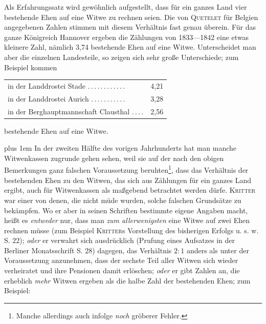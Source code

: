 Als Erfahrungssatz wird gewöhnlich aufgestellt, dass für ein ganzes Land vier bestehende Ehen auf eine Witwe zu rechnen seien. Die von \textsc{Quetelet} für Belgien angegebenen Zahlen stimmen mit diesem Verhältnis fast genau überein. Für das ganze Königreich Hannover ergeben die Zählungen von 1833—1842 eine etwas kleinere Zahl, nämlich 3,74 bestehende Ehen auf eine Witwe. Unterscheidet man aber die einzelnen Landesteile, so zeigen sich sehr große Unterschiede; zum Beispiel kommen
\begin{center}
\begin{tabular}{l@{\;}r}
in der Landdrostei Stade .\,.\,.\,.\,.\,.\,.\,.\,.\,.\,.\,. & 4,21\\
in der Landdrostei Aurich .\,.\,.\,.\,.\,.\,.\,.\,.\,.\,. & 3,28\\
in der Berghauptmannschaft Clausthal .\,.\,.\,. & 2,56
\end{tabular}
\end{center}
\noindent bestehende Ehen auf eine Witwe.

{\rightskip=0pt plus 1em
In der zweiten Hälfte des vorigen Jahrhunderts hat man manche Witwenkassen zugrunde gehen sehen, weil sie auf der nach den obigen Bemerkungen ganz falschen Voraussetzung beruhten\footnote{Manche allerdings auch infolge \textit{noch} gröberer Fehler.}, dass das Verhältnis der bestehenden Ehen zu den Witwen, das sich aus Zählungen für ein ganzes Land ergibt, auch für Witwenkassen als maßgebend betrachtet werden dürfe. \textsc{Kritter} war einer von denen, die nicht müde wurden, solche falschen Grundsätze zu bekämpfen. Wo er aber in seinen Schriften bestimmte eigene Angaben macht, heißt es \textit{entweder} nur, dass man \textit{zum allerwenigsten} eine Witwe auf zwei Ehen rechnen müsse (zum Beispiel \textsc{Kritter}s Vorstellung des bisherigen Erfolgs u. s. w. S. 22); \textit{oder} er verwahrt sich ausdrücklich (Prufung eines Aufsatzes in der Berliner Monatsschrift S. 28) dagegen, das Verhältnis \(2:1\) anders als unter der Voraussetzung anzunehmen, dass der sechste Teil aller Witwen sich wieder verheiratet und ihre Pensionen damit erlöschen; \textit{oder} er gibt Zahlen an, die erheblich \textit{mehr} Witwen ergeben als die halbe Zahl der bestehenden Ehen; zum Beispiel:\par}

